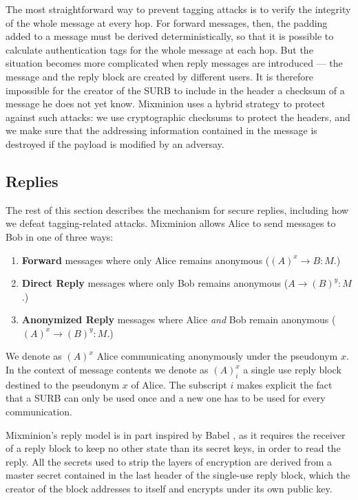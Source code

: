\documentclass[11pt]{IEEEtran}
\begin{document}
The most straightforward way to prevent tagging attacks is to
verify the integrity of the whole message at every hop.  For forward messages,
then, the padding added to a message must be derived deterministically,
so that it is possible to calculate
authentication tags for the whole message at each hop.  But
the situation becomes more complicated when reply messages are
introduced --- the message and the reply block are
created by different users. It is therefore impossible for the creator
of the SURB to include in the header a checksum of a message he
does not yet know. Mixminion uses a hybrid strategy to protect against
such attacks: we use cryptographic checksums to protect the headers,
and we make sure that the addressing information contained in the
message is destroyed if the payload is modified by an adversay.

\subsection{Replies}
\label{subsec:replies}

The rest of this section describes the mechanism for secure replies,
including how we defeat tagging-related attacks. 
Mixminion allows Alice to send messages to Bob in one of three ways:

\begin{enumerate}
\item \textbf{Forward} messages where only Alice remains anonymous
($(A)^x \rightarrow B: M$.) 
\item \textbf{Direct Reply} messages where only Bob remains anonymous 
($A \rightarrow (B)^y: M$.)
\item \textbf{Anonymized Reply} messages where Alice \emph{and} Bob
   remain anonymous ($(A)^x \rightarrow (B)^y: M$.)
\end{enumerate}

We denote as $(A)^x$ Alice communicating anonymously under the
pseudonym $x$. In the context of message contents we denote as
$(A)^x_i$ a single use reply block destined to the pseudonym $x$ of
Alice. The subscript $i$ makes explicit the fact that a SURB can only
be used once and a new one has to be used for every communication.

Mixminion's reply
model is in part inspired by Babel \cite{babel}, as it requires the
receiver of a reply block to keep no other state than its secret keys,
in order to read the reply.  All the secrets used
to strip the layers of encryption are derived from a master
secret contained in the last header of the single-use reply block, which
the creator of the block addresses to itself and encrypts under its
own public key.
\end{document}
